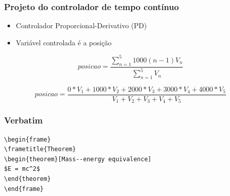 \begin{frame}
\frametitle{Projeto do controlador de tempo contínuo}

\begin{itemize}
\item Controlador Proporcional-Derivativo (PD)
\item Variável controlada é a posição
\end{itemize}

\begin{equation}\label{eq:posicao}
posicao = \frac{\sum_{n=1}^{5} 1000(n-1)V_{n}}{\sum_{n=1}^{5} V_{n}}
\end{equation}

\begin{equation}\label{eq:posicao2}
posicao = \frac{0*V_{1} + 1000*V_{2} + 2000*V_{3} + 3000*V_{4} + 4000*V_{5} }{V_{1} + V_{2} + V_{3} + V_{4} + V_{5}}
\end{equation}

\end{frame}


%


\begin{frame}[fragile] %
\frametitle{Verbatim}
\begin{example}
\begin{verbatim}
\begin{frame}
\frametitle{Theorem}
\begin{theorem}[Mass--energy equivalence]
$E = mc^2$
\end{theorem}
\end{frame}\end{verbatim}
\end{example}
\end{frame}



%     
%



